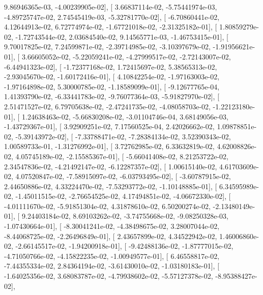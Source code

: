 \documentclass{article}
\begin{document}
          9.86946365e-03,  -4.00239905e-02],
       [  3.66837114e-02,  -5.75441974e-03,  -4.89725747e-02,
          2.74545419e-03,  -5.32781770e-02],
       [ -6.70860441e-02,   4.12644913e-02,   6.72774974e-02,
         -1.67721018e-02,  -2.31325182e-01],
       [  1.80859279e-02,  -1.72743544e-02,   2.03684540e-02,
          9.14565771e-03,  -1.46753415e-01],
       [  9.70017825e-02,   7.24599871e-02,  -2.39714985e-02,
         -3.10397679e-02,  -1.91956621e-01],
       [  3.66605052e-02,  -5.22059241e-02,  -4.27999517e-02,
         -2.72143007e-02,  -6.44941323e-02],
       [ -1.72377168e-02,   1.72415697e-02,   5.38565313e-02,
         -2.93045670e-02,  -1.60172416e-01],
       [  4.10842254e-02,  -1.97163003e-02,  -1.97164898e-02,
          5.30000785e-02,  -1.18589099e-01],
       [ -9.12677765e-04,   1.41393790e-02,  -6.33441783e-02,
         -9.76077364e-03,  -5.91827970e-02],
       [  2.51471527e-02,   6.79705638e-02,  -2.47241735e-02,
         -4.08058703e-02,  -1.22123180e-01],
       [  1.24638463e-02,  -5.66830208e-02,  -3.01104746e-04,
          3.68149056e-03,  -1.43729367e-01],
       [  3.92909251e-02,   7.17560525e-04,   2.42026662e-02,
          1.09878851e-02,  -5.39143972e-02],
       [ -7.33788471e-02,  -7.28384134e-02,   3.52390343e-02,
          1.00589733e-01,  -1.31276992e-01],
       [  3.72762985e-02,   6.33632819e-02,   4.62008826e-02,
          4.05745189e-02,  -2.15585367e-01],
       [ -5.66041408e-02,   8.21253722e-02,   2.34547836e-02,
         -4.21492147e-02,  -6.12287357e-02],
       [  1.00615140e-02,   4.61703609e-02,   4.07520847e-02,
         -7.58915097e-02,  -6.03793495e-02],
       [ -3.60787915e-02,   2.44650886e-02,   4.33224470e-02,
         -7.53293772e-02,  -1.10148885e-01],
       [  6.34595989e-02,  -1.45011515e-02,  -2.76654525e-02,
          4.17494851e-02,  -4.06672330e-02],
       [ -4.01111670e-02,  -5.91851304e-02,   4.31878610e-02,
          6.50200274e-02,  -2.13480149e-01],
       [  9.24403184e-02,   8.69103262e-02,  -3.74755668e-02,
         -9.08250328e-03,  -1.07430664e-01],
       [ -8.30041241e-02,  -4.38498675e-02,   3.28007044e-02,
         -8.44068725e-02,  -2.26496849e-01],
       [  2.43657899e-02,   4.34522942e-02,   1.46006860e-02,
         -2.66145517e-02,  -1.94200918e-01],
       [ -9.42488136e-02,  -1.87777015e-02,  -4.71050766e-02,
         -4.15822235e-02,  -1.00949577e-01],
       [  6.46558817e-02,  -7.44355334e-02,   2.84364194e-02,
         -3.61430010e-02,  -1.03180183e-01],
       [ -1.64025356e-02,   3.68083787e-02,  -4.79938602e-02,
         -5.57127378e-02,  -8.95388427e-02],
\end{document}

